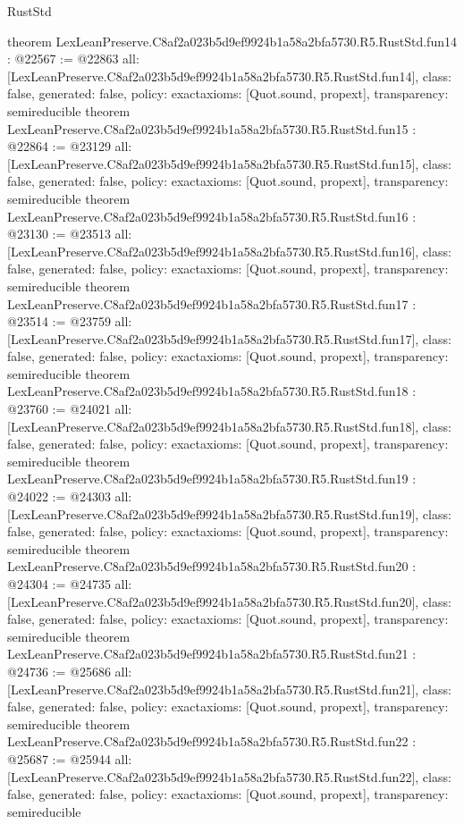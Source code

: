 \begin{lexlean}{RustStd}
\begin{coremodule}
{}
theorem LexLeanPreserve.C8af2a023b5d9ef9924b1a58a2bfa5730.R5.RustStd.fun14 : @22567 := @22863 {
  all: [LexLeanPreserve.C8af2a023b5d9ef9924b1a58a2bfa5730.R5.RustStd.fun14],
  class: false,
  generated: false,
  policy: exact{axioms: [Quot.sound, propext]},
  transparency: semireducible
}
theorem LexLeanPreserve.C8af2a023b5d9ef9924b1a58a2bfa5730.R5.RustStd.fun15 : @22864 := @23129 {
  all: [LexLeanPreserve.C8af2a023b5d9ef9924b1a58a2bfa5730.R5.RustStd.fun15],
  class: false,
  generated: false,
  policy: exact{axioms: [Quot.sound, propext]},
  transparency: semireducible
}
theorem LexLeanPreserve.C8af2a023b5d9ef9924b1a58a2bfa5730.R5.RustStd.fun16 : @23130 := @23513 {
  all: [LexLeanPreserve.C8af2a023b5d9ef9924b1a58a2bfa5730.R5.RustStd.fun16],
  class: false,
  generated: false,
  policy: exact{axioms: [Quot.sound, propext]},
  transparency: semireducible
}
theorem LexLeanPreserve.C8af2a023b5d9ef9924b1a58a2bfa5730.R5.RustStd.fun17 : @23514 := @23759 {
  all: [LexLeanPreserve.C8af2a023b5d9ef9924b1a58a2bfa5730.R5.RustStd.fun17],
  class: false,
  generated: false,
  policy: exact{axioms: [Quot.sound, propext]},
  transparency: semireducible
}
theorem LexLeanPreserve.C8af2a023b5d9ef9924b1a58a2bfa5730.R5.RustStd.fun18 : @23760 := @24021 {
  all: [LexLeanPreserve.C8af2a023b5d9ef9924b1a58a2bfa5730.R5.RustStd.fun18],
  class: false,
  generated: false,
  policy: exact{axioms: [Quot.sound, propext]},
  transparency: semireducible
}
theorem LexLeanPreserve.C8af2a023b5d9ef9924b1a58a2bfa5730.R5.RustStd.fun19 : @24022 := @24303 {
  all: [LexLeanPreserve.C8af2a023b5d9ef9924b1a58a2bfa5730.R5.RustStd.fun19],
  class: false,
  generated: false,
  policy: exact{axioms: [Quot.sound, propext]},
  transparency: semireducible
}
theorem LexLeanPreserve.C8af2a023b5d9ef9924b1a58a2bfa5730.R5.RustStd.fun20 : @24304 := @24735 {
  all: [LexLeanPreserve.C8af2a023b5d9ef9924b1a58a2bfa5730.R5.RustStd.fun20],
  class: false,
  generated: false,
  policy: exact{axioms: [Quot.sound, propext]},
  transparency: semireducible
}
theorem LexLeanPreserve.C8af2a023b5d9ef9924b1a58a2bfa5730.R5.RustStd.fun21 : @24736 := @25686 {
  all: [LexLeanPreserve.C8af2a023b5d9ef9924b1a58a2bfa5730.R5.RustStd.fun21],
  class: false,
  generated: false,
  policy: exact{axioms: [Quot.sound, propext]},
  transparency: semireducible
}
theorem LexLeanPreserve.C8af2a023b5d9ef9924b1a58a2bfa5730.R5.RustStd.fun22 : @25687 := @25944 {
  all: [LexLeanPreserve.C8af2a023b5d9ef9924b1a58a2bfa5730.R5.RustStd.fun22],
  class: false,
  generated: false,
  policy: exact{axioms: [Quot.sound, propext]},
  transparency: semireducible
}
\end{coremodule}
\end{lexlean}
